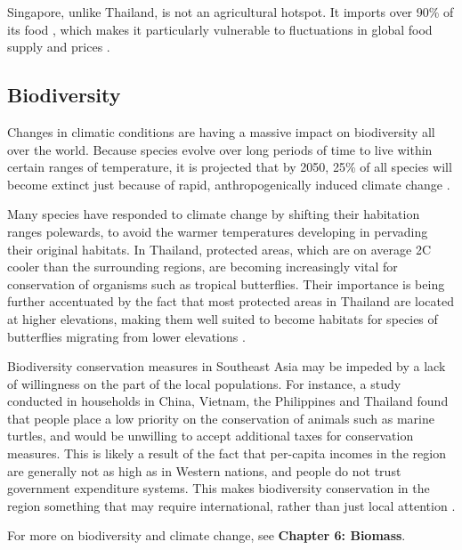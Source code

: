 Singapore, unlike Thailand, is not an agricultural hotspot. It imports over 90\% of its food , which makes it particularly vulnerable to fluctuations in global food supply and prices 
\citep{singaporeclimatechange}. 

\subsection{Biodiversity}

Changes in climatic conditions are having a massive impact on biodiversity all over the world. Because species evolve over long periods of time to live within certain ranges of temperature, it is projected that by 2050,  25\% of all species will become extinct just because of rapid, anthropogenically induced climate change \citep{harvardbio}. 

Many species have responded to climate change by shifting their habitation ranges polewards, to avoid the warmer temperatures developing in pervading their original habitats. In Thailand, protected areas, which are on average 2\degree C cooler than the surrounding regions, are becoming increasingly vital for conservation of organisms such as tropical butterflies. Their importance is being further accentuated by the fact that most protected areas in Thailand are located at higher elevations, making them well suited to become habitats for species of butterflies migrating from lower elevations \citep{butterflies}. 

Biodiversity conservation measures in Southeast Asia may be impeded by a lack of willingness on the part of the local populations. For instance, a study conducted in households in China, Vietnam, the Philippines and Thailand found that people place a low priority on the conservation of animals such as marine turtles, and would be unwilling to accept additional taxes for conservation measures. This is likely a result of the fact that per-capita incomes in the region are generally not as high as in Western nations, and people do not trust government expenditure systems. This makes biodiversity conservation in the region something that may require international, rather than just local attention \citep{turtles}. 

For more on biodiversity and climate change, see \textbf{Chapter 6: Biomass}. 


